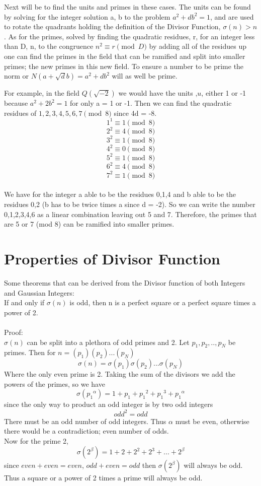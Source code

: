 \documentclass[12pt]{amsart}
\begin{document}
Next will be to find the units and primes in these cases. The units can be found by solving for the integer solution a, b to the problem $a^2 + db^2 = 1$, and are used to rotate the quadrants holding the definition of the Divisor Function, $\sigma(n)>n$. As for the primes, solved by finding the quadratic residues, r, for an integer less than D, n, to the congruence $n^2 \equiv r \pmod{D}$ by adding all of the residues up one can find the primes in the field that can be ramified and split into smaller primes; the new primes in this new field. To ensure a number to be prime the norm or $N(a + \sqrt{d}b) = a^2 + db^2$ will as well be prime. 

For example, in the field $Q(\sqrt{-2})$ we would have the units ,$u$, either 1 or -1 because $a^2 + 2b^2 = 1$ for only a = 1 or -1. Then we can find the quadratic residues of $1, 2, 3, 4, 5, 6, 7 \pmod{8}$ since 4d = -8. 
$$1^1 \equiv 1\pmod{8}$$
$$2^2 \equiv 4\pmod{8}$$
$$3^2 \equiv 1\pmod{8}$$
$$4^2 \equiv 0\pmod{8}$$
$$5^2 \equiv 1\pmod{8}$$
$$6^2 \equiv 4\pmod{8}$$
$$7^2 \equiv 1\pmod{8}$$
\\
We have for the integer a able to be the residues 0,1,4 and b able to be the residues 0,2 (b has to be twice times a since d = -2). So we can write the number 0,1,2,3,4,6 as a linear combination leaving out 5 and 7. Therefore, the primes that are 5 or 7 (mod 8) can be ramified into smaller primes. 

\section{Properties of Divisor Function}
Some theorems that can be derived from the Divisor function of both Integers and Gaussian Integers:
\\

\thm
If and only if $\sigma(n)$ is odd, then n is a perfect square or a perfect square times a power of 2.
\\
\\
\noindent
Proof:
\\
$\sigma(n)$ can be split into a plethora of odd primes and 2. Let $p_1,p_2,.., p_N$ be primes. Then for $n = (p_1)(p_2)...(p_N)$
$$\sigma(n) = \sigma(p_1)\sigma(p_2)...\sigma(p_N)$$
Where the only even prime is 2. Taking the sum of the divisors we add the powers of the primes, so we have $$\sigma({p_1}^{\alpha}) = 1 + p_1 + {p_1}^2 + {p_1}^3 + {p_1}^{\alpha}$$
since the only way to product an odd integer is by two odd integers $${odd}^2 = odd$$ There must be an odd number of odd integers. Thus $\alpha$ must be even, otherwise there would be a contradiction; even number of odds.
\\
Now for the prime 2, $$\sigma(2^\beta) = 1 + 2 + 2^2 + 2^3 + ... + 2^\beta$$
since $even + even = even$, $odd + even = odd$ then $\sigma(2^\beta)$ will always be odd. Thus a square or a power of 2 times a prime will always be odd.
\end{document}
